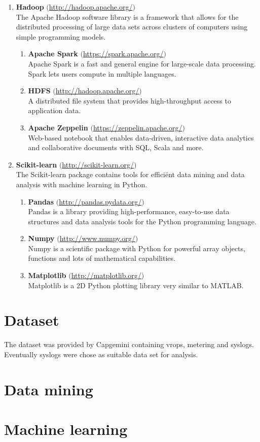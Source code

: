 \begin{enumerate}
    \item \textbf{Hadoop} $($\url{http://hadoop.apache.org/}$)$ \\
    The Apache Hadoop software library is a framework that allows for the distributed processing of large data sets across clusters of computers using simple programming models. 
    \begin{enumerate}
        \item \textbf{Apache Spark} $($\url{https://spark.apache.org/}$)$\\
        Apache Spark is a fast and general engine for large-scale data processing. Spark lets users compute in multiple languages.
        \item \textbf{HDFS} $($\url{http://hadoop.apache.org/}$)$ \\
         A distributed file system that provides high-throughput access to application data.
         \item \textbf{Apache Zeppelin} $($\url{https://zeppelin.apache.org/}$)$ \\
         Web-based notebook that enables data-driven, interactive data analytics and collaborative documents with SQL, Scala and more.
    \end{enumerate}
    
    \item \textbf{Scikit-learn} $($\url{http://scikit-learn.org/}$)$ \\
    The Scikit-learn package contains tools for effici\"ent data mining and data analysis with machine learning in Python.
    \begin{enumerate}
        \item \textbf{Pandas} $($\url{http://pandas.pydata.org/}$)$ \\
        Pandas is a library providing high-performance, easy-to-use data structures and data analysis tools for the Python programming language.
        \item \textbf{Numpy} $($\url{http://www.numpy.org/}$)$ \\
        Numpy is a scientific package with Python for powerful array objects, functions and lots of mathematical capabilities.
        \item \textbf{Matplotlib} $($\url{http://matplotlib.org/}$)$ \\
        Matplotlib is a 2D Python plotting library very similar to MATLAB.
        
    \end{enumerate}
    
\end{enumerate}

\section{Dataset}
The dataset was provided by Capgemini containing vrops, metering and syslogs. Eventually syslogs were chose as suitable data set for analysis. 

\section{Data mining}


\section{Machine learning}


